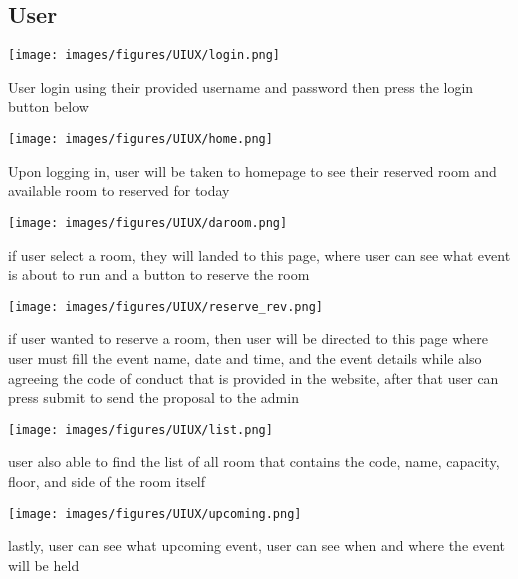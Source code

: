 \documentclass[12pt,titlepage,a4paper]{report}
\begin{document}
    \subsection{User}
    \begin{center}
        \texttt{[image: images/figures/UIUX/login.png]}\\
    \end{center}
    User login using their provided username and password then press the login button below
    \begin{center}
        \texttt{[image: images/figures/UIUX/home.png]}\\
    \end{center}
    Upon logging in, user will be taken to homepage to see their reserved room and available room to reserved for today
    \begin{center}
        \texttt{[image: images/figures/UIUX/daroom.png]}\\
    \end{center}
    if user select a room, they will landed to this page, where user can see what event is about to run and a button to reserve the room
    \begin{center}
        \texttt{[image: images/figures/UIUX/reserve\_rev.png]}\\
    \end{center}
    if user wanted to reserve a room, then user will be directed to this page where user must fill the event name, date and time, and the event details while also agreeing the code of conduct that is provided in the website, after that user can press submit to send the proposal to the admin
    \begin{center}
        \texttt{[image: images/figures/UIUX/list.png]}\\
    \end{center}
    user also able to find the list of all room that contains the code, name, capacity, floor, and side of the room itself
    \begin{center}
        \texttt{[image: images/figures/UIUX/upcoming.png]}\\
    \end{center}
    lastly, user can see what upcoming event, user can see when and where the event will be held
    \newpage
\end{document}
